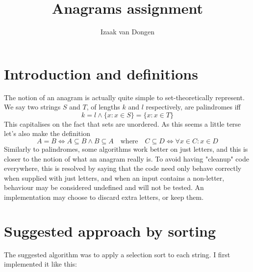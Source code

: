 \documentclass[fleqn,a4paper,11pt]{article}
\title{Anagrams assignment}
\author{Izaak van Dongen}
\begin{document}
    \maketitle
    \tableofcontents

    \section{Introduction and definitions}

    The notion of an anagram is actually quite simple to set-theoretically
    represent. We say two strings \(S\) and \(T\), of lengths \(k\) and \(l\)
    respectively, are palindromes iff
    \begin{equation}
        k = l \land \{x: x \in S\} = \{x: x \in T\}
    \end{equation}
    This capitalises on the fact that sets are unordered. As this seems a
    little terse let's also make the definition
    \begin{equation}
        A = B \iff A \subseteq B \land B \subseteq A \quad
            \text{where} \quad
            C \subseteq D \iff \forall x \in C: x \in D
    \end{equation}
    Similarly to palindromes, some algorithms work better on just letters, and
    this is closer to the notion of what an anagram really is. To avoid having
    "cleanup" code everywhere, this is resolved by saying that the code need
    only behave correctly when supplied with just letters, and when an input
    contains a non-letter, behaviour may be considered undefined and will not
    be tested. An implementation may choose to discard extra letters, or keep
    them.

    \section{Suggested approach by sorting}

    The suggested algorithm was to apply a selection sort to each string. I
    first implemented it like this:
\end{document}
